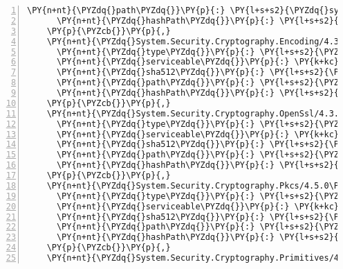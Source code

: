 \begin{Verbatim}[commandchars=\\\{\},numbers=left,firstnumber=1,stepnumber=1,numberblanklines=0]
      \PY{n+nt}{\PYZdq{}path\PYZdq{}}\PY{p}{:} \PY{l+s+s2}{\PYZdq{}system.security.cryptography.csp/4.3.0\PYZdq{}}\PY{p}{,}
      \PY{n+nt}{\PYZdq{}hashPath\PYZdq{}}\PY{p}{:} \PY{l+s+s2}{\PYZdq{}system.security.cryptography.csp.4.3.0.nupkg.sha512\PYZdq{}}
    \PY{p}{\PYZcb{}}\PY{p}{,}
    \PY{n+nt}{\PYZdq{}System.Security.Cryptography.Encoding/4.3.0\PYZdq{}}\PY{p}{:} \PY{p}{\PYZob{}}
      \PY{n+nt}{\PYZdq{}type\PYZdq{}}\PY{p}{:} \PY{l+s+s2}{\PYZdq{}package\PYZdq{}}\PY{p}{,}
      \PY{n+nt}{\PYZdq{}serviceable\PYZdq{}}\PY{p}{:} \PY{k+kc}{true}\PY{p}{,}
      \PY{n+nt}{\PYZdq{}sha512\PYZdq{}}\PY{p}{:} \PY{l+s+s2}{\PYZdq{}sha512\PYZhy{}1DEWjZZly9ae9C79vFwqaO5kaOlI5q+3/55ohmq/7dpDyDfc8lYe7YVxJUZ5MF/NtbkRjwFRo14yM4OEo9EmDw==\PYZdq{}}\PY{p}{,}
      \PY{n+nt}{\PYZdq{}path\PYZdq{}}\PY{p}{:} \PY{l+s+s2}{\PYZdq{}system.security.cryptography.encoding/4.3.0\PYZdq{}}\PY{p}{,}
      \PY{n+nt}{\PYZdq{}hashPath\PYZdq{}}\PY{p}{:} \PY{l+s+s2}{\PYZdq{}system.security.cryptography.encoding.4.3.0.nupkg.sha512\PYZdq{}}
    \PY{p}{\PYZcb{}}\PY{p}{,}
    \PY{n+nt}{\PYZdq{}System.Security.Cryptography.OpenSsl/4.3.0\PYZdq{}}\PY{p}{:} \PY{p}{\PYZob{}}
      \PY{n+nt}{\PYZdq{}type\PYZdq{}}\PY{p}{:} \PY{l+s+s2}{\PYZdq{}package\PYZdq{}}\PY{p}{,}
      \PY{n+nt}{\PYZdq{}serviceable\PYZdq{}}\PY{p}{:} \PY{k+kc}{true}\PY{p}{,}
      \PY{n+nt}{\PYZdq{}sha512\PYZdq{}}\PY{p}{:} \PY{l+s+s2}{\PYZdq{}sha512\PYZhy{}h4CEgOgv5PKVF/HwaHzJRiVboL2THYCou97zpmhjghx5frc7fIvlkY1jL+lnIQyChrJDMNEXS6r7byGif8Cy4w==\PYZdq{}}\PY{p}{,}
      \PY{n+nt}{\PYZdq{}path\PYZdq{}}\PY{p}{:} \PY{l+s+s2}{\PYZdq{}system.security.cryptography.openssl/4.3.0\PYZdq{}}\PY{p}{,}
      \PY{n+nt}{\PYZdq{}hashPath\PYZdq{}}\PY{p}{:} \PY{l+s+s2}{\PYZdq{}system.security.cryptography.openssl.4.3.0.nupkg.sha512\PYZdq{}}
    \PY{p}{\PYZcb{}}\PY{p}{,}
    \PY{n+nt}{\PYZdq{}System.Security.Cryptography.Pkcs/4.5.0\PYZhy{}rc1\PYZdq{}}\PY{p}{:} \PY{p}{\PYZob{}}
      \PY{n+nt}{\PYZdq{}type\PYZdq{}}\PY{p}{:} \PY{l+s+s2}{\PYZdq{}package\PYZdq{}}\PY{p}{,}
      \PY{n+nt}{\PYZdq{}serviceable\PYZdq{}}\PY{p}{:} \PY{k+kc}{true}\PY{p}{,}
      \PY{n+nt}{\PYZdq{}sha512\PYZdq{}}\PY{p}{:} \PY{l+s+s2}{\PYZdq{}sha512\PYZhy{}B94C7flTUrPLFCIn9QRZVySUiKzzQS9hLT3RDu+WDvNStCDXKRT/tpauxD4/GqVXXhaf2u9Q9TJ+Y34rw+LxZw==\PYZdq{}}\PY{p}{,}
      \PY{n+nt}{\PYZdq{}path\PYZdq{}}\PY{p}{:} \PY{l+s+s2}{\PYZdq{}system.security.cryptography.pkcs/4.5.0\PYZhy{}rc1\PYZdq{}}\PY{p}{,}
      \PY{n+nt}{\PYZdq{}hashPath\PYZdq{}}\PY{p}{:} \PY{l+s+s2}{\PYZdq{}system.security.cryptography.pkcs.4.5.0\PYZhy{}rc1.nupkg.sha512\PYZdq{}}
    \PY{p}{\PYZcb{}}\PY{p}{,}
    \PY{n+nt}{\PYZdq{}System.Security.Cryptography.Primitives/4.3.0\PYZdq{}}\PY{p}{:} \PY{p}{\PYZob{}}

\end{Verbatim}

